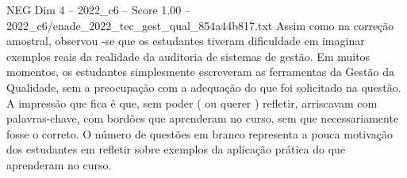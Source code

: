 \begin{textsample}{NEG Dim 4 – 2022\_c6 – Score 1.00 – 2022\_c6/enade\_2022\_tec\_gest\_qual\_854a44b817.txt}
Assim como na correção amostral, observou -se que os estudantes tiveram dificuldade em imaginar exemplos reais da realidade da auditoria de sistemas de gestão.
Em muitos momentos, os estudantes simplesmente escreveram as ferramentas da Gestão da Qualidade, sem a preocupação com a adequação do que foi solicitado na questão.
A impressão que fica é que, sem poder ( ou querer ) refletir, arriscavam com palavras-chave, com bordões que aprenderam no curso, sem que necessariamente fosse o correto.
O número de questões em branco representa a pouca motivação dos estudantes em refletir sobre exemplos da aplicação prática do que aprenderam no curso.

\end{textsample}
